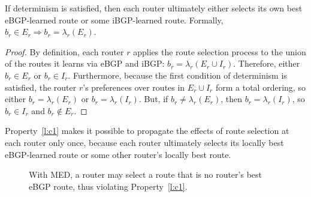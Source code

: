 \begin{property}\label{l:c1}
If determinism is satisfied, then each router
ultimately either selects its own best eBGP-learned route or some
iBGP-learned route.  Formally, $b_r \in E_r \Rightarrow b_r =
\lambda_r(E_r)$.
\end{property}
\vspace*{0.1in}
\begin{proof}
By definition, each router $r$ applies the route selection process to the union
of the routes it learns via eBGP and iBGP: $b_r = \lambda_r(E_r \cup
I_r)$. Therefore, either $b_r \in E_r$ or $b_r \in I_r$.  Furthermore,
because the first condition of determinism is satisfied, the router $r$'s
preferences over routes in $E_r \cup I_r$ form a total ordering, so
either $b_r = \lambda_r(E_r)$ or $b_r = \lambda_r(I_r)$.  But, if $b_r
\neq \lambda_r(E_r)$, then $b_r = \lambda_r(I_r)$, so $b_r\in I_r$ and
$b_r \not\in E_r$.
\end{proof}

\noindent
Property~\ref{l:c1} makes it possible to propagate the effects of route
selection at each router only once, because each router ultimately selects
its locally best eBGP-learned route or some other router's locally best route.


\begin{figure}[t]
\begin{center}
\begin{psfrags}
\end{psfrags}
\end{center}
\caption[With MED, a router may select a route that is no
  router's best eBGP route.]{With MED, a router may select a route that is no
  router's best eBGP route, thus violating Property~\ref{l:c1}.}
\label{fig:med_counterex}
\end{figure}

